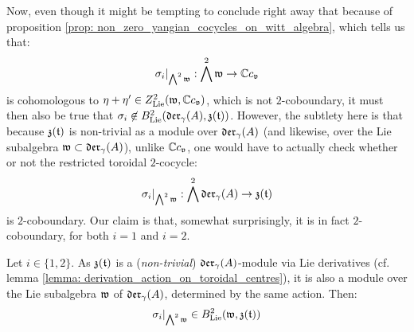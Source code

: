         Now, even though it might be tempting to conclude right away that because of proposition \ref{prop: non_zero_yangian_cocycles_on_witt_algebra}, which tells us that:
            $$\sigma_i|_{\bigwedge^2 \mathfrak{w}}: \bigwedge^2 \mathfrak{w} \to \mathbb{C} c_{\mathfrak{v}}$$
        is cohomologous to $\eta + \eta' \in Z^2_{\mathrm{Lie}}(\mathfrak{w}, \mathbb{C} c_{\mathfrak{v}})$, which is not $2$-coboundary, it must then also be true that $\sigma_i \not \in B^2_{\mathrm{Lie}}(\mathfrak{der}_{\gamma}(A), \mathfrak{z}(\mathfrak{t}))$. However, the subtlety here is that because $\mathfrak{z}(\mathfrak{t})$ is non-trivial as a module over $\mathfrak{der}_{\gamma}(A)$ (and likewise, over the Lie subalgebra $\mathfrak{w} \subset \mathfrak{der}_{\gamma}(A)$), unlike $\mathbb{C} c_{\mathfrak{v}}$, one would have to actually check whether or not the restricted toroidal $2$-cocycle:
            $$\sigma_i|_{\bigwedge^2 \mathfrak{w}}: \bigwedge^2 \mathfrak{der}_{\gamma}(A) \to \mathfrak{z}(\mathfrak{t})$$
        is $2$-coboundary. Our claim is that, somewhat surprisingly, it is in fact $2$-coboundary, for both $i = 1$ and $i = 2$.
        \begin{proposition} \label{prop: non_trivial_yangian_restricted_coboundaries_examples}
            Let $i \in \{1, 2\}$. As $\mathfrak{z}(\mathfrak{t})$ is a (\textit{non-trivial}) $\mathfrak{der}_{\gamma}(A)$-module via Lie derivatives (cf. lemma \ref{lemma: derivation_action_on_toroidal_centres}), it is also a module over the Lie subalgebra $\mathfrak{w}$ of $\mathfrak{der}_{\gamma}(A)$, determined by the same action. Then:
                $$\sigma_i|_{ \bigwedge^2 \mathfrak{w} } \in B^2_{\mathrm{Lie}}(\mathfrak{w}, \mathfrak{z}(\mathfrak{t}))$$
        \end{proposition}
